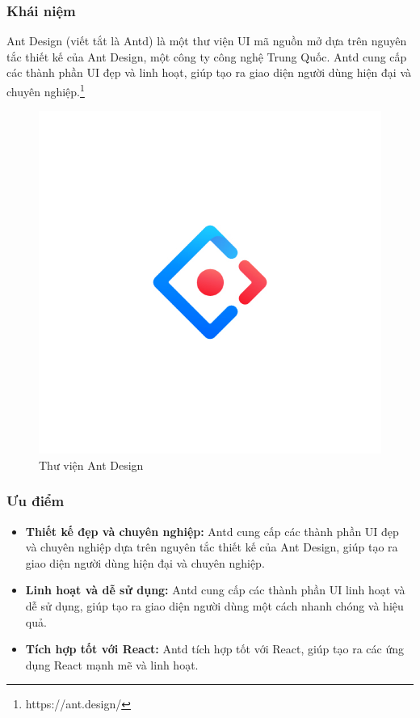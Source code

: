 \subsubsection{Khái niệm}
\noindent Ant Design (viết tắt là Antd) là một thư viện UI mã nguồn mở dựa trên nguyên tắc thiết kế của Ant Design, một công ty công nghệ Trung Quốc. Antd cung cấp các thành phần UI đẹp và linh hoạt, giúp tạo ra giao diện người dùng hiện đại và chuyên nghiệp.\footnote{https://ant.design/}
\begin{figure}[H]
  \begin{center}
    \includegraphics[scale=0.3]{images/hieu/phuluc/antd.jpg}
    \caption{Thư viện Ant Design}
  \end{center}
\end{figure}
\subsubsection{Ưu điểm}
\begin{itemize}
  \item \textbf{Thiết kế đẹp và chuyên nghiệp:} Antd cung cấp các thành phần UI đẹp và chuyên nghiệp dựa trên nguyên tắc thiết kế của Ant Design, giúp tạo ra giao diện người dùng hiện đại và chuyên nghiệp.
  \item \textbf{Linh hoạt và dễ sử dụng:} Antd cung cấp các thành phần UI linh hoạt và dễ sử dụng, giúp tạo ra giao diện người dùng một cách nhanh chóng và hiệu quả.
  \item \textbf{Tích hợp tốt với React:} Antd tích hợp tốt với React, giúp tạo ra các ứng dụng React mạnh mẽ và linh hoạt.
\end{itemize}
